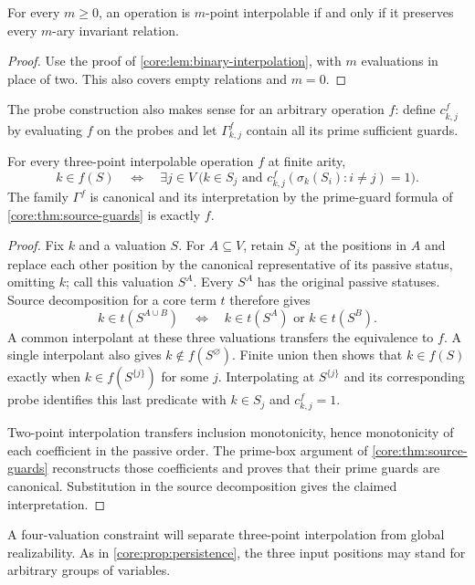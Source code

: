 \begin{lemma}\label{core:lem:finite-interpolation}
For every $m\geq0$, an operation is $m$-point interpolable if and only
if it preserves every $m$-ary invariant relation.
\end{lemma}
\begin{proof}
Use the proof of \cref{core:lem:binary-interpolation}, with $m$ evaluations
in place of two. This also covers empty relations and $m=0$.
\end{proof}

The probe construction also makes sense for an arbitrary operation $f$:
define $c^f_{k,j}$ by evaluating $f$ on the probes and let $\Gamma^f_{k,j}$
contain all its prime sufficient guards.

\begin{proposition}\label{core:prop:local-guards}
For every three-point interpolable operation $f$ at finite arity,
\[
 k\in f(S)\quad\Longleftrightarrow\quad
 \exists j\in V\ \bigl(k\in S_j\text{ and }
 c^f_{k,j}(\sigma_k(S_i):i\ne j)=1\bigr).
\]
The family $\Gamma^f$ is canonical and its interpretation by the
prime-guard formula of \cref{core:thm:source-guards} is exactly $f$.
\end{proposition}
\begin{proof}
Fix $k$ and a valuation $S$. For $A\subseteq V$, retain $S_j$ at the
positions in $A$ and replace each other position by the canonical
representative of its passive status, omitting $k$; call this valuation
$S^A$. Every $S^A$ has the original passive statuses. Source decomposition
for a core term $t$ therefore gives
\[
 k\in t(S^{A\cup B})\quad\Longleftrightarrow\quad
 k\in t(S^A)\text{ or }k\in t(S^B).
\]
A common interpolant at these three valuations transfers the equivalence
to $f$. A single interpolant also gives $k\notin f(S^\varnothing)$.
Finite union then shows that $k\in f(S)$ exactly when
$k\in f(S^{\{j\}})$ for some $j$. Interpolating at $S^{\{j\}}$ and
its corresponding probe identifies this last predicate with
$k\in S_j$ and $c^f_{k,j}=1$.

Two-point interpolation transfers inclusion monotonicity, hence
monotonicity of each coefficient in the passive order. The prime-box
argument of \cref{core:thm:source-guards} reconstructs those coefficients
and proves that their prime guards are canonical. Substitution in the
source decomposition gives the claimed interpretation.
\end{proof}

A four-valuation constraint will separate three-point interpolation from
global realizability. As in \cref{core:prop:persistence}, the three input
positions may stand for arbitrary groups of variables.

